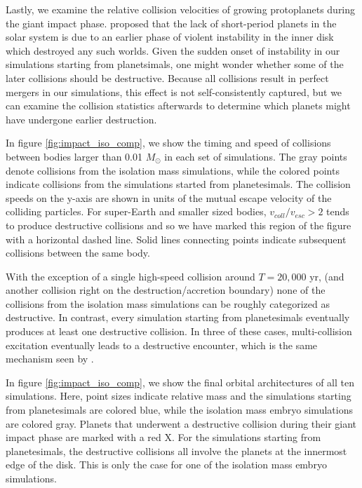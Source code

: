 Lastly, we examine the relative collision velocities of growing protoplanets during the giant impact phase. \cite{volk15} proposed that the lack of short-period planets in the solar system is due to an earlier phase of violent instability in the inner disk which destroyed any such worlds. Given the sudden onset of instability in our simulations starting from planetsimals, one might wonder whether some of the later collisions should be destructive. Because all collisions result in perfect mergers in our simulations, this effect is not self-consistently captured, but we can examine the collision statistics afterwards to determine which planets might have undergone earlier destruction.

In figure \ref{fig:impact_iso_comp}, we show the timing and speed of collisions between bodies larger than 0.01 $M_{\odot}$ in each set of simulations. The gray points denote collisions from the isolation mass simulations, while the colored points indicate collisions from the simulations started from planetesimals. The collision speeds on the y-axis are shown in units of the mutual escape velocity of the colliding particles. For super-Earth and smaller sized bodies, $v_{coll}/v_{esc} > 2$ tends to produce destructive collisions \cite{marcus09} and so we have marked this region of the figure with a horizontal dashed line. Solid lines connecting points indicate subsequent collisions between the same body.

With the exception of a single high-speed collision around $T = 20,000$ yr, (and another collision right on the destruction/accretion boundary) none of the collisions from the isolation mass simulations can be roughly categorized as destructive. In contrast, every simulation starting from planetesimals eventually produces at least one destructive collision. In three of these cases, multi-collision excitation eventually leads to a destructive encounter, which is the same mechanism seen by \cite{volk15}.

In figure \ref{fig:impact_iso_comp}, we show the final orbital architectures of all ten simulations. Here, point sizes indicate relative mass and the simulations starting from planetesimals are colored blue, while the isolation mass embryo simulations are colored gray. Planets that underwent a destructive collision during their giant impact phase are marked with a red X. For the simulations starting from planetesimals, the destructive collisions all involve the planets at the innermost edge of the disk. This is only the case for one of the isolation mass embryo simulations. 

